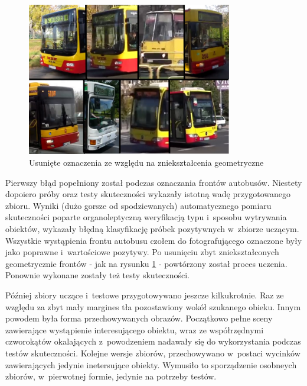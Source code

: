 \begin{figure}[h!]
	\centering
	\includegraphics[width=0.8\textwidth]{img/exp_removed_distorted_fronts}
	\caption{Usunięte oznaczenia ze względu na zniekształcenia geometryczne}
	\label{fig:deformation_samples}
\end{figure}

Pierwszy błąd popełniony został podczas oznaczania
frontów autobusów. Niestety dopoiero próby oraz testy skuteczności wykazały
istotną wadę przygotowanego zbioru. Wyniki (dużo gorsze od spodziewanych)
automatycznego pomiaru skuteczności poparte organoleptyczną weryfikacją 
typu i~sposobu wytrywania obiektów, wykazały błędną klasyfikację próbek pozytywnych
w~zbiorze uczącym. Wszystkie wystąpienia frontu autobusu czołem do fotografującego
oznaczone były jako poprawne i~wartościowe pozytywy. Po usunięciu zbyt
zniekształconych geometrycznie frontów - jak na rysunku \ref{fig:deformation_samples} -
powtórzony został proces uczenia. Ponownie wykonane zostały też testy skuteczności.


Później zbiory uczące i~testowe przygotowywano jeszcze kilkukrotnie. Raz ze względu
za zbyt mały margines tła pozostawiony wokół szukanego obieku. Innym powodem 
była forma przechowywanych obrazów. Początkowo pełne sceny zawierające wystąpienie
interesującego obiektu, wraz ze współrzędnymi czworokątów okalających z~powodzeniem
nadawały się do wykorzystania podczas testów skuteczności. Kolejne wersje
zbiorów, przechowywano w~postaci wycinków zawierających jedynie inetersujące obiekty.
Wymusiło to sporządzenie osobneych zbiorów, w~pierwotnej formie, jedynie na potrzeby testów.

